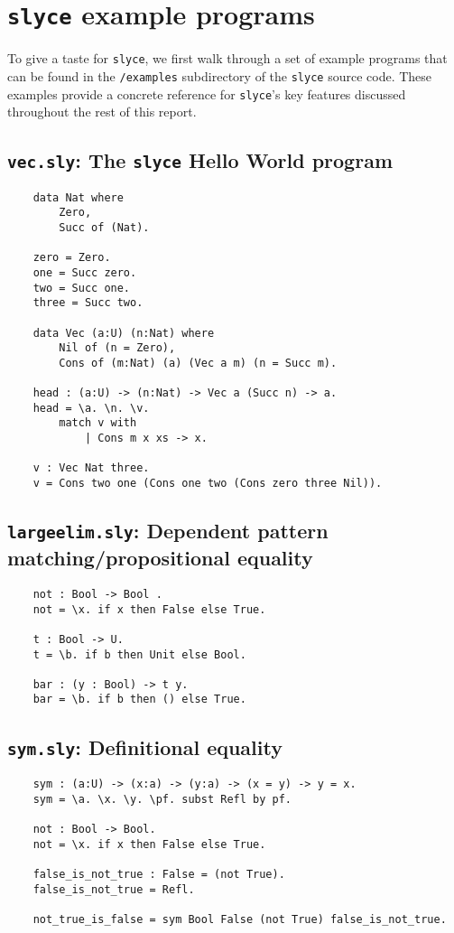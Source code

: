 \section{\texttt{slyce} example programs}
To give a taste for \texttt{slyce}, we first walk through a set of example programs that can be found in the \texttt{/examples} subdirectory of the \texttt{slyce} source code.
These examples provide a concrete reference for \texttt{slyce}'s key features discussed throughout the rest of this report.
\subsection{\texttt{vec.sly}: The \texttt{slyce} Hello World program}
\begin{lstlisting}
    data Nat where
        Zero,
        Succ of (Nat).

    zero = Zero.
    one = Succ zero.
    two = Succ one.
    three = Succ two.

    data Vec (a:U) (n:Nat) where
        Nil of (n = Zero),
        Cons of (m:Nat) (a) (Vec a m) (n = Succ m).

    head : (a:U) -> (n:Nat) -> Vec a (Succ n) -> a.
    head = \a. \n. \v.
        match v with
            | Cons m x xs -> x.

    v : Vec Nat three.
    v = Cons two one (Cons one two (Cons zero three Nil)).
\end{lstlisting}
\subsection{\texttt{largeelim.sly}: Dependent pattern matching/propositional equality}
\begin{lstlisting}
    not : Bool -> Bool .
    not = \x. if x then False else True.
    
    t : Bool -> U.
    t = \b. if b then Unit else Bool.
    
    bar : (y : Bool) -> t y.
    bar = \b. if b then () else True.    
\end{lstlisting}
\subsection{\texttt{sym.sly}: Definitional equality}
\begin{lstlisting}
    sym : (a:U) -> (x:a) -> (y:a) -> (x = y) -> y = x.
    sym = \a. \x. \y. \pf. subst Refl by pf.

    not : Bool -> Bool.
    not = \x. if x then False else True.

    false_is_not_true : False = (not True).
    false_is_not_true = Refl.

    not_true_is_false = sym Bool False (not True) false_is_not_true.
\end{lstlisting}
